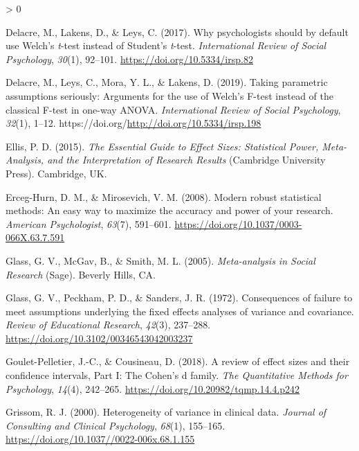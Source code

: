 \documentclass[
  english,
  man,floatsintext]{apa6}
\newlength{\cslhangindent}
\newenvironment{CSLReferences}[2] %
 {%
  \setlength{\parindent}{0pt}
  \ifodd #1 \everypar{\setlength{\hangindent}{\cslhangindent}}\ignorespaces\fi
  \ifnum #2 > 0
  \setlength{\parskip}{#2\baselineskip}
  \fi
 }%
 {}
\begin{document}
\begin{CSLReferences}{1}{0}
\leavevmode\hypertarget{ref-Delacre_et_al_2017}{}%
Delacre, M., Lakens, D., \& Leys, C. (2017). Why psychologists should by default use {W}elch's \emph{t}-test instead of {S}tudent's \emph{t}-test. \emph{International Review of Social Psychology}, \emph{30}(1), 92--101. \url{https://doi.org/10.5334/irsp.82}

\leavevmode\hypertarget{ref-Delacre_et_al_2019}{}%
Delacre, M., Leys, C., Mora, Y. L., \& Lakens, D. (2019). Taking parametric assumptions seriously: Arguments for the use of {W}elch's {F}-test instead of the classical {F}-test in one-way {ANOVA}. \emph{International Review of Social Psychology}, \emph{32}(1), 1--12. https://doi.org/\url{http://doi.org/10.5334/irsp.198}

\leavevmode\hypertarget{ref-Ellis_2015}{}%
Ellis, P. D. (2015). \emph{{T}he {E}ssential {G}uide to {E}ffect {S}izes: {S}tatistical {P}ower, {M}eta-{A}nalysis, and the {I}nterpretation of {R}esearch {R}esults} (Cambridge University Press). Cambridge, UK.

\leavevmode\hypertarget{ref-Erceg-Hurn_Mirosevich_2008}{}%
Erceg-Hurn, D. M., \& Mirosevich, V. M. (2008). Modern robust statistical methods: An easy way to maximize the accuracy and power of your research. \emph{American Psychologist}, \emph{63}(7), 591--601. \url{https://doi.org/10.1037/0003-066X.63.7.591}

\leavevmode\hypertarget{ref-Glass_et_al_1981}{}%
Glass, G. V., McGav, B., \& Smith, M. L. (2005). \emph{Meta-analysis in {S}ocial {R}esearch} (Sage). Beverly Hills, CA.

\leavevmode\hypertarget{ref-Glass_et_al_1972}{}%
Glass, G. V., Peckham, P. D., \& Sanders, J. R. (1972). Consequences of failure to meet assumptions underlying the fixed effects analyses of variance and covariance. \emph{Review of Educational Research}, \emph{42}(3), 237--288. \url{https://doi.org/10.3102/00346543042003237}

\leavevmode\hypertarget{ref-Pelletier_Cousineau_2018}{}%
Goulet-Pelletier, J.-C., \& Cousineau, D. (2018). {A} review of effect sizes and their confidence intervals, {P}art {I}: {T}he {C}ohen's d family. \emph{{T}he {Q}uantitative {M}ethods for {P}sychology}, \emph{14}(4), 242--265. \url{https://doi.org/10.20982/tqmp.14.4.p242}

\leavevmode\hypertarget{ref-Grissom_2000}{}%
Grissom, R. J. (2000). Heterogeneity of variance in clinical data. \emph{Journal of Consulting and Clinical Psychology}, \emph{68}(1), 155--165. \url{https://doi.org/10.1037//0022-006x.68.1.155}


\end{CSLReferences}
\end{document}
